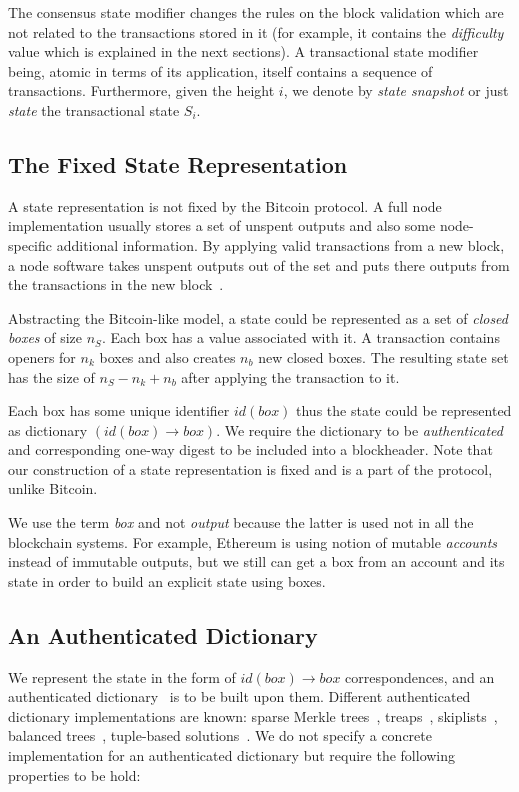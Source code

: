 \documentclass[conference,compsoc]{IEEEtran}
\begin{document}
The consensus state modifier changes the rules on the block validation which are not related to the transactions stored in it (for example, it contains the \textit{difficulty} value  which is explained in the next sections). A transactional state modifier being, atomic in terms of its application, itself contains a sequence of transactions. Furthermore, given the height \(i\), we denote by \textit{state snapshot} or just \textit{state} the transactional state \(S_i\). 


\subsection{The Fixed State Representation}
\label{fixed_rep}

A state representation is not fixed by the Bitcoin protocol. A full node implementation usually stores a set of unspent outputs and also some node-specific additional information. By applying valid transactions from a new block, a node software takes unspent outputs out of the set and puts there outputs from the transactions in the new block~\cite{Nakamoto2008}. 

Abstracting the Bitcoin-like model, a state could be represented as a set of \textit{closed boxes} of size \(n_S\). Each box has a value associated with it. A transaction contains openers for \(n_k\) boxes and also creates \(n_b\) new closed boxes. The resulting state set has the size of \(n_S-n_k+n_b\) after applying the transaction to it. 

Each box has some unique identifier \(id(box)\) thus the state could be represented as dictionary \((id(box) \rightarrow box)\). We require the dictionary to be \textit{authenticated} and corresponding one-way digest to be included into a blockheader. Note that our construction of a state representation is fixed and is a part of the protocol, unlike Bitcoin.

We use the term \textit{box} and not \textit{output} because the latter is used not in all the blockchain systems. For example, Ethereum\cite{ethyp} is using notion of mutable \textit{accounts} instead of immutable outputs, but we still can get a box from an account and its state in order to build an explicit state using boxes.

\subsection{An Authenticated Dictionary}

We represent the state in the form of \(id(box) \rightarrow box\) correspondences, and an authenticated dictionary~\cite{nissim1998certificate, kocher1998certificate} is to be built upon them. Different authenticated dictionary implementations are known: sparse Merkle trees~\cite{sparsemerkle}, treaps~\cite{crosby2011authenticated}, skiplists~\cite{anagnostopoulos2001persistent}, balanced trees~\cite{nissim1998certificate}, tuple-based solutions~\cite{crosby2011authenticated}. We do not specify a concrete implementation for an authenticated dictionary but require the following properties to be hold:
\end{document}
